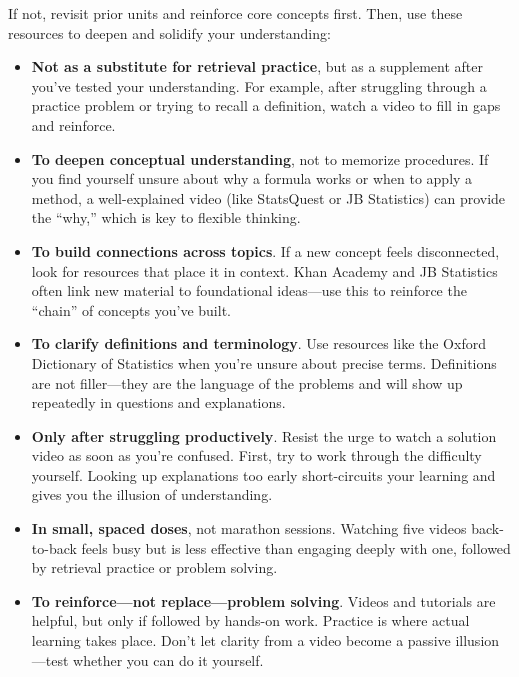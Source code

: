 \documentclass[12pt]{article}
\begin{document}
If not, revisit prior units and reinforce core concepts first. Then, use these resources to deepen and solidify your understanding:
\begin{itemize}
    \item \textbf{Not as a substitute for retrieval practice}, but as a supplement after you've tested your understanding. For example, after struggling through a practice problem or trying to recall a definition, watch a video to fill in gaps and reinforce.

    \item \textbf{To deepen conceptual understanding}, not to memorize procedures. If you find yourself unsure about why a formula works or when to apply a method, a well-explained video (like StatsQuest or JB Statistics) can provide the “why,” which is key to flexible thinking.

    \item \textbf{To build connections across topics}. If a new concept feels disconnected, look for resources that place it in context. Khan Academy and JB Statistics often link new material to foundational ideas—use this to reinforce the “chain” of concepts you’ve built.

    \item \textbf{To clarify definitions and terminology}. Use resources like the Oxford Dictionary of Statistics when you're unsure about precise terms. Definitions are not filler—they are the language of the problems and will show up repeatedly in questions and explanations.

    \item \textbf{Only after struggling productively}. Resist the urge to watch a solution video as soon as you’re confused. First, try to work through the difficulty yourself. Looking up explanations too early short-circuits your learning and gives you the illusion of understanding.

    \item \textbf{In small, spaced doses}, not marathon sessions. Watching five videos back-to-back feels busy but is less effective than engaging deeply with one, followed by retrieval practice or problem solving.

    \item \textbf{To reinforce—not replace—problem solving}. Videos and tutorials are helpful, but only if followed by hands-on work. Practice is where actual learning takes place. Don’t let clarity from a video become a passive illusion—test whether you can do it yourself.
\end{itemize}
\end{document}
